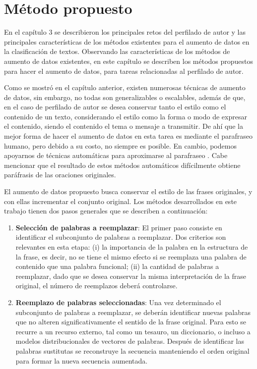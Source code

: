 \chapter{Método propuesto}

En el capítulo 3 se describieron los principales retos del perfilado de autor y las principales características de los métodos existentes para el aumento de datos en la clasificación de textos. Observando las características de los métodos de aumento de datos existentes, en este capítulo se describen los métodos propuestos para hacer el aumento de datos, para tareas relacionadas al perfilado de autor. 

Como se mostró en el capítulo anterior, existen numerosas técnicas de aumento de datos, sin embargo, no todas son generalizables o escalables, además de que, en el caso de perfilado de autor se desea conservar tanto el estilo como el contenido de un texto, considerando el estilo como la forma o modo de expresar el contenido, siendo el contenido el tema o mensaje a transmitir. De ahí que la mejor forma de hacer el aumento de datos en esta tarea es mediante el parafraseo humano, pero debido a su costo, no siempre es posible. En cambio, podemos apoyarnos de técnicas automáticas para aproximarse al parafraseo \citep{androutsopoulos2010survey}. Cabe mencionar que el resultado de estos métodos automáticos difícilmente obtiene paráfrasis de las oraciones originales. 

El aumento de datos propuesto busca conservar el estilo de las frases originales, y con ellas incrementar el conjunto original. Los métodos desarrollados en este trabajo tienen dos pasos generales que se describen a continuación: 

\begin{enumerate}
    \item \textbf{Selección de palabras a reemplazar}: El primer paso consiste en identificar el subconjunto de palabras a reemplazar. Dos criterios son relevantes en esta etapa: (i) la importancia de la palabra en la estructura de la frase, es decir, no se tiene el mismo efecto si se reemplaza una palabra de contenido que una palabra funcional; (ii) la cantidad de palabras a reemplazar, dado que se desea conservar la misma interpretación de la frase original, el número de reemplazos deberá controlarse.  
    \item \textbf{Reemplazo de palabras seleccionadas}: Una vez determinado el subconjunto de palabras a reemplazar, se deberán identificar nuevas palabras que no alteren significativamente el sentido de la frase original. Para esto se recurre a un recurso externo, tal como un tesauro, un diccionario, o incluso a modelos distribucionales de vectores de palabras.
     Después de identificar las palabras sustitutas se reconstruye la secuencia manteniendo el orden original para formar la nueva secuencia aumentada. 
\end{enumerate}

